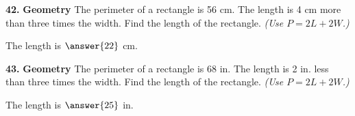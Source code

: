 \documentclass{ximera}
\begin{document}
\begin{problem}
\textbf{42.} \textbf{Geometry} The perimeter of a rectangle is 56 cm. The length is 4 cm more
  than three times the width. Find the length of the rectangle.
  \emph{(Use $P = 2L + 2W$.)}

The length is $\answer{22}$ cm.
\end{problem}

\begin{problem}
\textbf{43.} \textbf{Geometry} The perimeter of a rectangle is 68 in. The length is 2 in. less
  than three times the width. Find the length of the rectangle.
  \emph{(Use $P = 2L + 2W$.)}

The length is $\answer{25}$ in.
\end{problem}
\end{document}
